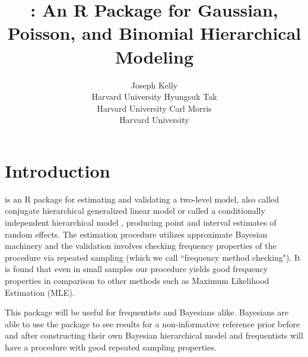 \documentclass[article]{jss}
\author{Joseph Kelly\\Harvard University \And 
             Hyungsuk Tak\\Harvard University\And
             Carl Morris\\ Harvard University}
\title{\pkg{Rgbp}: An R Package for Gaussian, Poisson, and Binomial Hierarchical Modeling}
\begin{document}

\section[introduction]{Introduction}
 is an R package for estimating and validating a two-level model, also called conjugate hierarchical generalized linear model \citep{hglm2006, hglm2010} or called a conditionally independent hierarchical model \citep{1989}, producing point and interval estimates of  random effects. The estimation procedure utilizes approximate Bayesian machinery and the validation involves checking frequency properties of the procedure via repeated sampling (which we call ``frequency method checking"). It is found that even in small samples our procedure yields good frequency properties in comparison to other methods such as Maximum Likelihood Estimation (MLE). 

This package will be useful for frequentists and Bayesians alike. Bayesians are able to use the package to see results for a non-informative reference prior before and after constructing their own Bayesian hierarchical model and frequentists will have a procedure with good repeated sampling properties.



\end{document}
